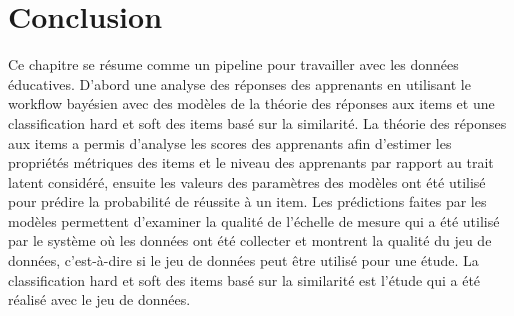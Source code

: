 \section{Conclusion}
Ce chapitre se résume comme un pipeline pour travailler avec les données éducatives. D’abord une analyse des réponses des apprenants en utilisant le workflow bayésien avec des modèles de la théorie des réponses aux items et une classification hard et soft des items basé sur la similarité. La théorie des réponses aux items a permis d’analyse les scores des apprenants afin d’estimer les propriétés métriques
des items et le niveau des apprenants par rapport au trait latent considéré, ensuite les valeurs des paramètres des modèles ont été utilisé pour prédire la probabilité de réussite à un item. Les prédictions faites par les modèles permettent d’examiner la qualité de l’échelle de mesure qui a été utilisé par le système où les données ont été collecter et montrent la qualité du jeu de données, c’est-à-dire si le jeu de données peut être utilisé pour une étude. La classification hard et soft des items basé sur la similarité est l’étude qui a été réalisé avec le jeu de données.

 